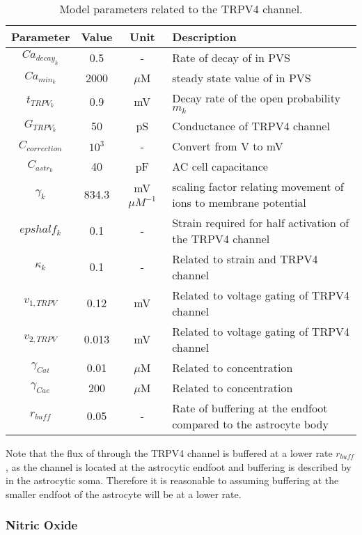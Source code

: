 	\begin{table}[h!]
		\small
		\centering
			\begin{tabular}{c c c l}
		\hline
		Parameter & Value & Unit & Description \\
		\hline
		$Ca_{decay_k}$ & 0.5 & - & Rate of decay of \ca in PVS \\
		$Ca_{min_k}$ & 2000 & $\mu$M & steady state value of \ca in PVS \\
		$t_{TRPV_k}$ & 0.9 & mV & Decay rate of the open probability $m_k$ \\
		$G_{TRPV_k}$ & 50 & pS & Conductance of TRPV4 channel \\
		$C_{correction}$ & $10^3$ & - & Convert from V to mV \\
		$C_{astr_k}$ & 40 & pF & AC cell capacitance \\
		$\gamma_k$ & 834.3 & mV $\mu M^{-1}$ & scaling factor relating movement of ions to membrane potential \\
		$epshalf_k$ & 0.1 & - & Strain required for half activation of the TRPV4 channel \\
		$\kappa_k$ & 0.1 & - & Related to strain and TRPV4 channel \\
		$v_{1,TRPV}$ & 0.12 & mV & Related to voltage gating of TRPV4 channel \\
		$v_{2,TRPV}$ & 0.013 & mV & Related to voltage gating of TRPV4 channel \\
		$\gamma_{Cai}$ & 0.01 & $\mu$M & Related to \ca concentration \\
		$\gamma_{Cae}$ & 200 & $\mu$M & Related to \ca concentration \\
		$r_{buff}$ & 0.05 & - & Rate of \ca buffering at the endfoot compared to the astrocyte body \\
		\hline
			\end{tabular}
			\caption{Model parameters related to the TRPV4 channel.}
			\label{tab:NVU12trpv4param}
	\end{table}
	
	Note that the flux of \ca through the TRPV4 channel is buffered at a lower rate $r_{buff}$, as the channel is located at the astrocytic endfoot and buffering is described by \cite{Witthoft2013} in the astrocytic soma. Therefore it is reasonable to assuming buffering at the smaller endfoot of the astrocyte will be at a lower rate. 
	
	\subsubsection{Nitric Oxide}
	
